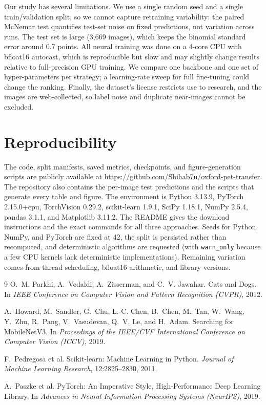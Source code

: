 \documentclass[10pt]{article}
\begin{document}
Our study has several limitations. We use a single random seed and a single
train/validation split, so we cannot capture retraining variability: the paired McNemar
test quantifies test-set noise on fixed predictions, not variation across runs. The test
set is large (3,669 images), which keeps the binomial standard error around 0.7 points.
All neural training was done on a 4-core CPU with bfloat16 autocast, which is
reproducible but slow and may slightly change results relative to full-precision GPU
training. We compare one backbone and one set of hyper-parameters per strategy; a
learning-rate sweep for full fine-tuning could change the ranking. Finally, the dataset's license restricts use to
research, and the images are web-collected, so label noise and duplicate near-images
cannot be excluded.

\section{Reproducibility}
The code, split manifests, saved metrics, checkpoints, and figure-generation scripts are
publicly available at \url{https://github.com/Shihab7u/oxford-pet-transfer}. The
repository also contains the per-image test predictions and the scripts that generate
every table and figure. The environment is Python 3.13.9, PyTorch 2.15.0+cpu, TorchVision 0.29.2,
scikit-learn 1.9.1, SciPy 1.18.1, NumPy 2.5.4, pandas 3.1.1, and Matplotlib 3.11.2. The README gives
the download instructions and the exact commands for all three approaches. Seeds for
Python, NumPy, and PyTorch are fixed at 42, the split is persisted rather than
recomputed, and deterministic algorithms are requested (with \texttt{warn\_only} because
a few CPU kernels lack deterministic implementations). Remaining variation comes from
thread scheduling, bfloat16 arithmetic, and library versions.

\begin{thebibliography}{9}
O.~M. Parkhi, A.~Vedaldi, A.~Zisserman, and C.~V. Jawahar.
\newblock Cats and Dogs.
\newblock In \emph{IEEE Conference on Computer Vision and Pattern Recognition (CVPR)},
2012.

A.~Howard, M.~Sandler, G.~Chu, L.-C. Chen, B.~Chen, M.~Tan, W.~Wang, Y.~Zhu,
R.~Pang, V.~Vasudevan, Q.~V. Le, and H.~Adam.
\newblock Searching for MobileNetV3.
\newblock In \emph{Proceedings of the IEEE/CVF International Conference on Computer
Vision (ICCV)}, 2019.

F.~Pedregosa et al.
\newblock Scikit-learn: Machine Learning in Python.
\newblock \emph{Journal of Machine Learning Research}, 12:2825--2830, 2011.

A.~Paszke et al.
\newblock PyTorch: An Imperative Style, High-Performance Deep Learning Library.
\newblock In \emph{Advances in Neural Information Processing Systems (NeurIPS)}, 2019.
\end{thebibliography}
\end{document}
